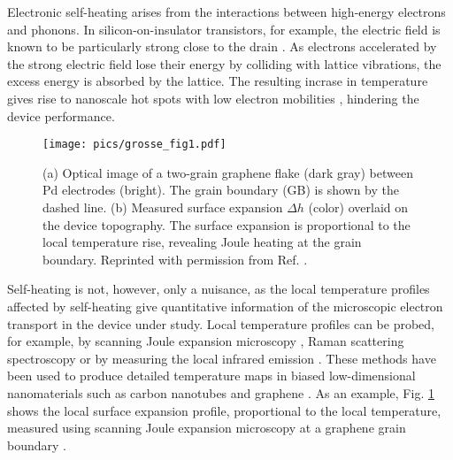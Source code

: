 Electronic self-heating arises from the interactions between high-energy electrons and phonons. In silicon-on-insulator transistors, for example, the electric field is known to be particularly strong close to the drain \cite{pop06_ieee}. As electrons accelerated by the strong electric field lose their energy by colliding with lattice vibrations, the excess energy is absorbed by the lattice. The resulting incrase in temperature gives rise to nanoscale hot spots with low electron mobilities \cite{pop06_ieee}, hindering the device performance. %


\begin{figure}
\begin{center}
 \texttt{[image: pics/grosse\_fig1.pdf]}
 \caption{(a) Optical image of a two-grain graphene flake (dark gray) between Pd electrodes (bright). The grain boundary (GB) is shown by the dashed line. (b) Measured surface expansion $\Delta h$ (color) overlaid on the device topography. The surface expansion is proportional to the local temperature rise, revealing Joule heating at the grain boundary. Reprinted with permission from Ref. \cite{grosse14}.}
\label{fig:intro_grosse}
\end{center}
\end{figure} 

Self-heating is not, however, only a nuisance, as the local temperature profiles affected by self-heating give quantitative information of the microscopic electron transport in the device under study. Local temperature profiles can be probed, for example, by scanning Joule expansion microscopy \cite{varesi98}, Raman scattering spectroscopy \cite{calizo07} or by measuring the local infrared emission \cite{bae10}. These methods have been used to produce detailed temperature maps in biased low-dimensional nanomaterials such as carbon nanotubes \cite{estrada11,xie12} and graphene \cite{bae10,freitag09,chae10,freitag10}. As an example, Fig. \ref{fig:intro_grosse} shows the local surface expansion profile, proportional to the local temperature, measured using scanning Joule expansion microscopy at a graphene grain boundary \cite{grosse14}.

